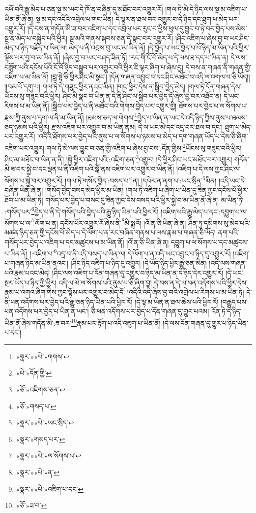 འཕོ་བའི་རྒྱུ་མེད་པ་ཅན་སྔ་མ་ཡང་དེ་ཁོ་ན་བཞིན་དུ་མཐོང་བར་འགྱུར་རོ། །གལ་ཏེ་མེ་དེ་ཉིད་ལས་སྔ་མ་འཇིག་པ་ཡིན་ནོ་ཞེ་ན། སྔ་མ་དང་འདིའི་འབྲེལ་པ་གང་ཡིན། དེ་ལྟར་ན་ཐལ་བར་འགྱུར་བ་དེ་ཉིད་དང་ཐུག་པ་མེད་པར་འགྱུར་རོ། །དེ་བས་ན་གདོན་མི་ཟ་བར་འཇིག་པ་དང་འབྲེལ་པར་རུང་བ་ཕྱིས་ཕུལ་དུ་བྱུང་བ་ཉེ་བར་བྱེད་པས་མེས་སྔ་ན་མེད་པ་བསྐྱེད་པའི་ཕྱིར། སྔ་མའི་གནས་སྐབས་ཅན་དེ་སྣང་བར་འགྱུར་རོ། །ཤིང་འཇིག་པ་ཞེས་བྱ་བ་ཡང་ཤིང་མེད་པ་ཉིད་བརྗོད་པ་ཡིན་ལ། མེད་པ་ནི་འབྲས་བུ་ཡང་མ་ཡིན་ནོ། །དེ་བྱེད་པ་ཡང་བྱེད་པ་པོ་ཉིད་མ་ཡིན་པའི་ཕྱིར་ལྟོས་པར་བྱ་བ་མ་ཡིན་ནོ། །ཞེས་བྱ་བ་ཡང་བཤད་ཟིན་ཏོ། །རང་གི་ངོ་བོ་མེད་པ་དེ་ལས་ཐ་དད་པ་ཡིན་ན། དེ་ལས་བཟློག་པའི་དངོས་པོའི་ངོ་བོ་ཉིད་བསྒྲུབ་པར་འགྱུར་བའི་ཕྱིར་ཇི་ལྟར་ཞིག་པ་ཞེས་བྱ། དེ་བས་ན་གཞན་ནི་གཞན་གྱི་འཇིག་པ་མ་ཡིན་ནོ། །བླ་སྟེ་ཅི་ཕྱིར་ཤིང་མི་སྣང་། །དོན་གཞན་འབྱུང་བ་དང་ཤིང་མཐོང་བ་འདི་ལ་འགལ་བ་ཅི་ཡོད།། །།བམ་པོ་དགུ་པ། གལ་ཏེ་དེ་གཟུང་ཕྱིར་ནའང་མིན། །གང་ཕྱིར་དེས་ན་སྒྲིབ་བྱེད་མེད། །གལ་ཏེ་དོན་གཞན་དེས་ཡོངས་སུ་གཟུང་བའི་ཕྱིར། ཤིང་མི་སྣང་བ་ཡིན་ན་དེ་ནི་ཤིང་ལ་སྒྲིབ་པར་བྱེད་དོ་ཞེས་བྱ་བར་འཐོབ་ན། དེ་ཡང་རིགས་པ་མ་ཡིན་ནོ། །སྒྲིབ་པར་བྱེད་པ་ནི་མཐོང་བའི་གེགས་བྱེད་པར་འགྱུར་གྱི། ཐོགས་པར་བྱེད་པ་ལ་སོགས་པ་རྫས་ཀྱི་ནུས་པ་དག་ལ་ནི་མ་ཡིན་ནོ། །ཐམས་ཅད་ལ་གེགས་\footnote{«སྣར་»«པེ་»གགས་}བྱེད་པ་ཡིན་ན་ཡང་དེ་འདི་ཉིད་ཀྱིས་ནུས་པ་ཐམས་ཅད་ཉམས་པའི་ཕྱིར། རྫས་འཇིག་པར་འགྱུར་བ་མ་ཡིན་ནམ། དེ་ལ་ཡང་མེ་དང་འདྲ་བར་ཐལ་བ་དང་། ཐུག་པ་མེད་པར་འགྱུར་རོ། །འདིའི་ཐོགས་པར་བྱེད་པའི་ནུས་པ་ལ་སོགས་པ་ཉམས་པ་མེད་པ་དག་གཞན་ཡོད་པ་དེས་ཅི་ཞིག་འཇིག་པར་འགྱུར། གལ་ཏེ་མེ་ལས་བྱུང་བ་ཅན་གྱི་འཇིག་པ་ཞེས་བྱ་བས་:དོན་གྱིས་\footnote{«པེ་»དོན་གྱི་}ཡོངས་སུ་གཟུང་བའི་ཕྱིར། ཤིང་མ་མཐོང་བ་ཡིན་ན་ནི། །སྐྱེ་ཕྱིར་འཇིག་པའི་:འཇིག་ཅན་\footnote{«ཅོ་»འཇིགས་ཅན་}འགྱུར། །དེ་ཕྱིར་ཤིང་ཡང་མཐོང་བར་འགྱུར། གདོན་མི་ཟ་བར་སྐྱེ་བ་དང་ལྡན་པ་ནི་འཇིག་པའི་སྒོ་ནས་འཇིག་པར་འགྱུར་བ་ཡིན་ནོ། །འཇིག་པ་དེ་ལས་ཀྱང་ཤིང་ལ་སོགས་པ་སྐྱེ་བར་འགྱུར་རོ། །གལ་ཏེ་གསོད་བྱེད་:བསད་པ་\footnote{«ཅོ་»གསད་པ་}ན། །དཔེར་ན་ནག་པ་:ཡང་སྲིན་\footnote{«སྣར་»«པེ་»ཡང་སྲིད་}མིན། །འདི་ཡང་དེ་བཞིན་ཡིན་ཞེ་ན། །གསོད་བྱེད་བསད་མེད་ཕྱིར་མ་ཡིན། །གལ་ཏེ་འཇིག་པ་ཞིག་པ་ཡིན་དུ་ཟིན་ཀྱང་དངོས་པོ་ཕྱིར་ཐོབ་པ་མ་ཡིན་ཏེ། གསོད་པར་བྱེད་པ་བསང་དུ་ཟིན་ཀྱང་དེས་བསད་པའི་ཕྱིར་སྐྱེ་བ་མ་ཡིན་ནོ་ཞེ་ན། མ་ཡིན་ཏེ། :གསོད་པར་\footnote{«སྣར་»གསད་པར་}བྱེད་པ་ནི་དེ་གསོད་པའི་བྱེད་པའི་རྒྱུ་ཉིད་ཡིན་པའི་ཕྱིར་རོ། །འཇིག་པའི་རྒྱུ་མེད་པ་དང་:དབྱུག་པ་ལ་སོགས་པ་ལ་\footnote{«སྣར་»«པེ་»ལ་སོགས་པ་}ལོག་པ་ན། དངོས་པོར་འགྱུར་རོ་ཞེས་ནི་\footnote{«སྣར་»«པེ་»ན་}མི་སྨྲའོ། །འོ་ན་ཅི་ཡིན་ཞེ་ན། ཤིན་ཏུ་དམིགས་སུ་མེད་པའི་མཚན་ཉིད་ཅན་གྱི་དངོས་པོ་མེད་པ་དེ་ལོག་པ་ན་རང་བཞིན་གནས་པ་ལས་རྣམ་པ་གཞན་ཅི་ཡོད། ནག་པའི་གསོད་པར་བྱེད་པ་འཇིག་པ་དང་མཚུངས་པ་མ་ཡིན་ནོ། །འོ་ན་ཅི་ཡིན་ཞེ་ན། དབྱུག་པ་ལ་སོགས་པ་དང་མཚུངས་པ་ཡིན་ནོ། །:འཇིག་པ་\footnote{«སྣར་»«པེ་»འཇིག་པ་དང་}འདྲ་བ་ནི་འདི་བསད་པ་ཡིན་ལ། དེ་ལོག་པ་ན་འདི་ཡང་འབྱུང་བ་ཉིད་དུ་འགྱུར་རོ། །འཇིག་པ་གཞན་ཉིད་མ་ཡིན་ནའང་། །ཤིང་ཉིད་འཇིག་པ་ཉིད་དུ་འགྱུར། །དེ་ཡོད་ཉིད་ཕྱིར་རྒྱུ་ཅན་མིན། །འདི་ལས་གཞན་པའི་རྣམ་པའང་མེད། །ཤིང་ལས་འཇིག་པ་དོན་གཞན་དུ་འགྱུར་བ་ཉིད་མ་ཡིན་ན་དེ་ཉིད་དེར་འགྱུར་རོ། །དེ་ཡང་སྔར་ཡོད་པ་ཉིད་ཀྱི་ཕྱིར། འདི་ལ་མེ་ལ་སོགས་པའི་ནུས་པ་ཅི་ཞིག་བྱ། དེ་བས་ན་དེ་ལ་ཕན་འདོགས་པའི་ཕྱིར་དེས་རྣམ་པ་འགའ་ཞིག་གིས་ཀྱང་ལྟོས་པར་འགྱུར་བ་མེད་དོ། །འདིའི་འདི་ཞེས་བྱ་བའི་འགྲེལ་པ་རིགས་པ་མ་ཡིན་ཏེ། དེ་ནི་ཕན་འདོགས་པར་བྱེད་པའི་རྒྱུ་ཅན་ཉིད་ཡིན་པའི་ཕྱིར་རོ། །དེ་ལྟ་མ་ཡིན་ན་ཐལ་ཆེས་པའི་ཕྱིར་རོ། །བརྒྱུད་པས་ཕན་འདོགས་པར་བྱེད་པ་ཡིན་ན་ཡང་། ཅི་ཕན་འདོགས་པར་བྱེད་པ་དོན་གཞན་དུ་གྱུར་པའམ། འོན་ཏེ་དེ་ཉིད་ཡིན་ནོ་ཞེས་གདོན་མི་:ཟ་བར་\footnote{«ཅོ་»ཟ་བ་}རྣམ་པར་རྟོག་པ་འདི་འཇུག་པ་ཡིན་ནོ། །དེ་ལས་དོན་གཞན་དུ་གྱུར་པ་ཉིད་ཡིན་པ་དང་། 